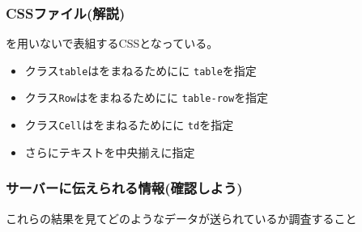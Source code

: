 \begin{frame}[containsverbatim]
 \frametitle{CSSファイル(解説)}
 を用いないで表組するCSSとなっている。
 \begin{itemize}
	\item クラス\texttt{table}はをまねるためにに
				\texttt{table}を指定
	\item クラス\texttt{Row}はをまねるためにに
				\texttt{table-row}を指定
	\item クラス\texttt{Cell}はをまねるためにに
				\texttt{td}を指定
	\item さらにテキストを中央揃えに指定
 \end{itemize}
\end{frame}
\begin{frame}[containsverbatim]
 \frametitle{サーバーに伝えられる情報(確認しよう)}

 これらの結果を見てどのようなデータが送られているか調査すること
\end{frame}

\begin{frame}[containsverbatim]
 \frametitle{}
\end{frame}
